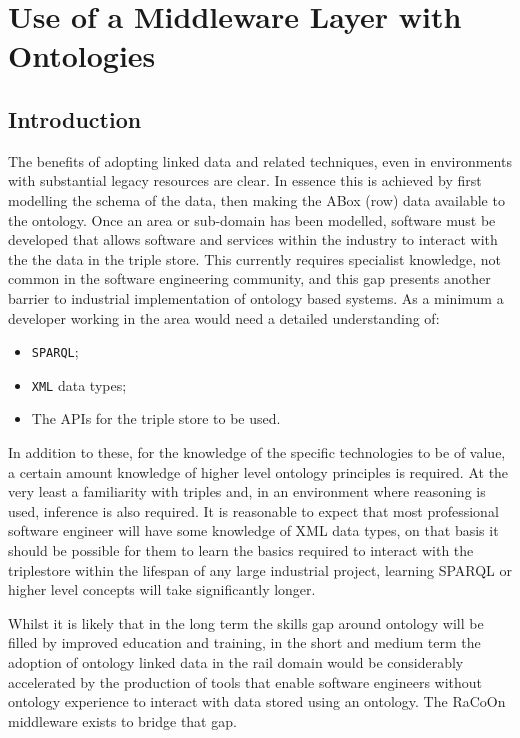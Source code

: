 \chapter{Use of a Middleware Layer with Ontologies}\label{ch:middleware}
\section{Introduction}\label{sec:mwintro}
The benefits of adopting linked data and related techniques, even in environments with substantial legacy resources are clear. In essence this is achieved by first modelling the schema of the data, then making the ABox (row) data available to the ontology. Once an area or sub-domain has been modelled, software must be developed that allows software and services within the industry to interact with the the data in the triple store. This currently requires specialist knowledge, not common in the software engineering community, and this gap presents another barrier to industrial implementation of ontology based systems. As a minimum a developer working in the area would need a detailed understanding of:
\begin{itemize}
    \item \texttt{SPARQL};
    \item \texttt{XML} data types;
    \item The APIs for the triple store to be used.
\end{itemize}

In addition to these, for the knowledge of the specific technologies to be of value, a certain amount knowledge of higher level ontology principles is required. At the very least a familiarity with triples and, in an environment where reasoning is used, inference is also required. It is reasonable to expect that most professional software engineer will have some knowledge of XML data types, on that basis it should be possible for them to learn the basics required to interact with the triplestore within the lifespan of any large industrial project, learning SPARQL or higher level concepts will take significantly longer.

Whilst it is likely that in the long term the skills gap around ontology will be filled by improved education and training, in the short and medium term the adoption of ontology linked data in the rail domain would be considerably accelerated by the production of tools that enable software engineers without ontology experience to interact with data stored using an ontology. The RaCoOn middleware exists to bridge that gap.


